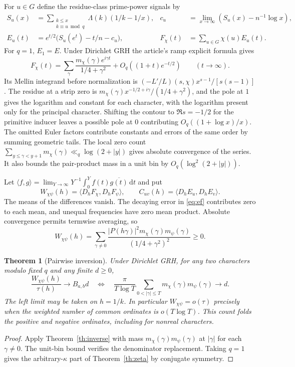 \documentclass[11pt]{article}
\newtheorem{theorem}{Theorem}[section]
\newcommand{\dd}{\,\mathrm d}
\newcommand{\ol}{\overline}
\begin{document}
For $u\in G$ define the residue-class prime-power signals by
\begin{align*}
 S_u(x)&=\sum_{\substack{k\le x\\k\equiv u\bmod q}}\Lambda(k)(1/k-1/x),&
 c_u&=\lim_{x\to\infty}(S_u(x)-n^{-1}\log x),\\
 E_u(t)&=e^{t/2}\big(S_u(e^t)-t/n-c_u\big),&
 F_\chi(t)&=\sum_{u\in G}\chi(u)E_u(t).
\end{align*}
For $q=1$, $E_1=E$. Under Dirichlet GRH the article's ramp explicit formula gives
\begin{equation}\label{eq:ef}
 F_\chi(t)=\sum_\gamma\frac{m_\chi(\gamma)e^{i\gamma t}}{1/4+\gamma^2}
       +O_q((1+t)e^{-t/2})\qquad(t\to\infty).
\end{equation}
Its Mellin integrand before normalization is $(-L'/L)(s,\chi)x^{s-1}/[s(s-1)]$. The residue at a strip zero is $m_\chi(\gamma)x^{-1/2+i\gamma}/(1/4+\gamma^2)$, and the pole at $1$ gives the logarithm and constant for each character, with the logarithm present only for the principal character. Shifting the contour to $\Re s=-1/2$ for the primitive inducer leaves a possible pole at $0$ contributing $O_q((1+\log x)/x)$. The omitted Euler factors contribute constants and errors of the same order by summing geometric tails. The local zero count $\sum_{y\le\gamma<y+1}m_\chi(\gamma)\ll_q\log(2+|y|)$ gives absolute convergence of the series. It also bounds the pair-product mass in a unit bin by $O_q(\log^2(2+|y|))$.

Let $\langle f,g\rangle=\lim_{Y\to\infty}Y^{-1}\int_0^Y f(t)\ol{g(t)}\dd t$ and put
\[
 W_{\chi\psi}(h)=\langle D_hF_\chi,D_hF_\psi\rangle,\qquad
 C_{uv}(h)=\langle D_hE_u,D_hE_v\rangle .
\]
The means of the differences vanish. The decaying error in \eqref{eq:ef} contributes zero to each mean, and unequal frequencies have zero mean product. Absolute convergence permits termwise averaging, so
\begin{equation}\label{eq:W}
 W_{\chi\psi}(h)=\sum_{\gamma\ne0}
 \frac{|P(h\gamma)|^2m_\chi(\gamma)m_\psi(\gamma)}{(1/4+\gamma^2)^2}\ge0 .
\end{equation}

\begin{theorem}[Pairwise inversion]\label{th:pair}
Under Dirichlet GRH, for any two characters modulo fixed $q$ and any finite $d\ge0$,
\[
 \frac{W_{\chi\psi}(h)}{\tau(h)}\longrightarrow B_{a,b}d
 \quad\Longleftrightarrow\quad
 \frac{\pi}{T\log T}\sum_{0<|\gamma|\le T}m_\chi(\gamma)m_\psi(\gamma)\longrightarrow d .
\]
The left limit may be taken on $h=1/k$. In particular $W_{\chi\psi}=o(\tau)$ precisely when the weighted number of common ordinates is $o(T\log T)$. This count folds the positive and negative ordinates, including for nonreal characters.
\end{theorem}
\begin{proof}
Apply Theorem~\ref{th:inverse} with mass $m_\chi(\gamma)m_\psi(\gamma)$ at $|\gamma|$ for each $\gamma\ne0$. The unit-bin bound verifies the denominator replacement. Taking $q=1$ gives the arbitrary-$\kappa$ part of Theorem~\ref{th:zeta} by conjugate symmetry.
\end{proof}
\end{document}
